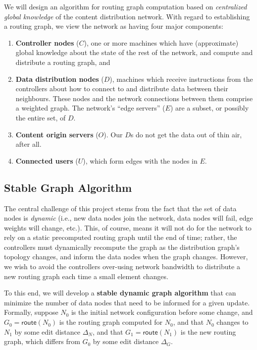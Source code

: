 We will design an algorithm for routing graph computation based on {\em centralized global knowledge} of the content distribution network. With regard to establishing a routing graph, we view the network as having four major components:
\begin{enumerate}
	\item {\bf Controller nodes} ($C$), one or more machines which have (approximate) global knowledge about the state of the rest of the network, and compute and distribute a routing graph, and
	\item {\bf Data distribution nodes} ($D$), machines which receive instructions from the controllers about how to connect to and distribute data between their neighbours.
	These nodes and the network connections between them comprise a weighted graph.
	The network's ``edge servers'' ($E$) are a subset, or possibly the entire set, of $D$.
	\item {\bf Content origin servers} ($O$). Our $D$s do not get the data out of thin air, after all.
	\item {\bf Connected users} ($U$), which form edges with the nodes in $E$.
\end{enumerate}

\subsection{Stable Graph Algorithm}

The central challenge of this project stems from the fact that the set of data nodes is {\em dynamic} (i.e., new data nodes join the network, data nodes will fail, edge weights will change, etc.).
This, of course, means it will not do for the network to rely on a static precomputed routing graph until the end of time; rather, the controllers must dynamically recompute the graph as the distribution graph's topology changes, and inform the data nodes when the graph changes.
However, we wish to avoid the controllers over-using network bandwidth to distribute a new routing graph each time a small element changes.

To this end, we will develop a {\bf stable dynamic graph algorithm} that can minimize the number of data nodes that need to be informed for a given update.
Formally, suppose $N_0$ is the initial network configuration before some change, and $G_0 = \mathsf{route}(N_0)$ is the routing graph computed for $N_0$, and that $N_0$ changes to $N_1$ by some edit distance $\Delta_N$, and that $G_1 = \mathsf{route}(N_1)$ is the new routing graph, which differs from $G_0$ by some edit distance $\Delta_G$.

